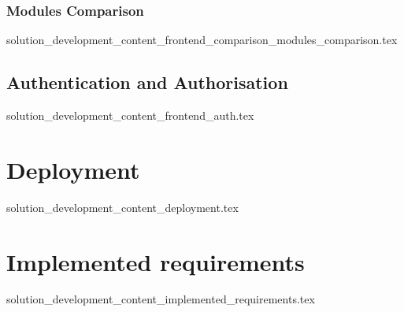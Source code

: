   \subsubsection{Modules Comparison}\label{sub:frontend_comparison_modules_comparison}
    {solution_development_content_frontend_comparison_modules_comparison.tex}

\subsection{Authentication and Authorisation}\label{sub:frontend_auth}
  {solution_development_content_frontend_auth.tex}

\section{Deployment}
  {solution_development_content_deployment.tex}

\section{Implemented requirements}
  {solution_development_content_implemented_requirements.tex}

